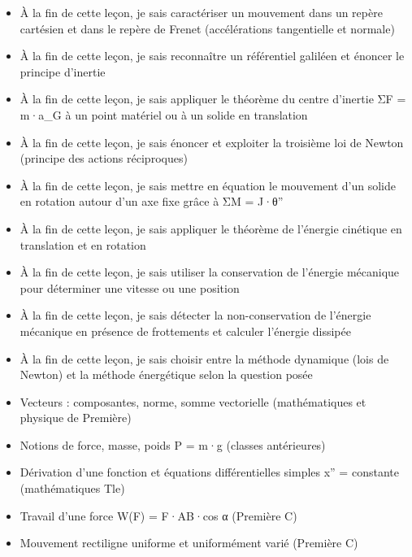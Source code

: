 \documentclass[11pt]{article}
\begin{document}
\begin{objectifs}
\begin{itemize}
\item À la fin de cette leçon, je sais caractériser un mouvement dans un repère cartésien et dans le repère de Frenet (accélérations tangentielle et normale)
\item À la fin de cette leçon, je sais reconnaître un référentiel galiléen et énoncer le principe d'inertie
\item À la fin de cette leçon, je sais appliquer le théorème du centre d'inertie ΣF = m·a\_G à un point matériel ou à un solide en translation
\item À la fin de cette leçon, je sais énoncer et exploiter la troisième loi de Newton (principe des actions réciproques)
\item À la fin de cette leçon, je sais mettre en équation le mouvement d'un solide en rotation autour d'un axe fixe grâce à ΣM = J·θ''
\item À la fin de cette leçon, je sais appliquer le théorème de l'énergie cinétique en translation et en rotation
\item À la fin de cette leçon, je sais utiliser la conservation de l'énergie mécanique pour déterminer une vitesse ou une position
\item À la fin de cette leçon, je sais détecter la non-conservation de l'énergie mécanique en présence de frottements et calculer l'énergie dissipée
\item À la fin de cette leçon, je sais choisir entre la méthode dynamique (lois de Newton) et la méthode énergétique selon la question posée
\end{itemize}
\end{objectifs}

\begin{prerequis}
\begin{itemize}
\item Vecteurs : composantes, norme, somme vectorielle (mathématiques et physique de Première)
\item Notions de force, masse, poids P = m·g (classes antérieures)
\item Dérivation d'une fonction et équations différentielles simples x'' = constante (mathématiques Tle)
\item Travail d'une force W(F) = F·AB·cos α (Première C)
\item Mouvement rectiligne uniforme et uniformément varié (Première C)
\end{itemize}
\end{prerequis}
\end{document}
